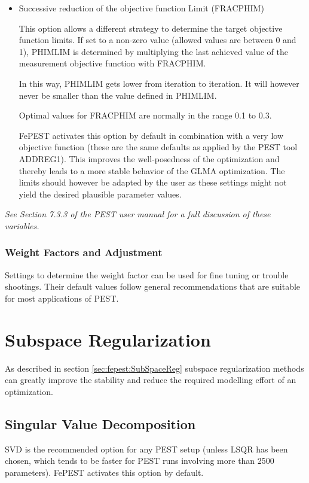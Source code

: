 \begin{itemize}
\item Successive reduction of the objective function Limit (FRACPHIM)

This option allows a different strategy to determine the target objective function limits. If set to a non-zero value (allowed values are between 0 and 1), PHIMLIM is determined by multiplying the last achieved value of the measurement objective function with FRACPHIM.

In this way, PHIMLIM gets lower from iteration to iteration. It will however never be smaller than the value defined in PHIMLIM.

Optimal values for FRACPHIM are normally in the range 0.1 to 0.3. 

FePEST activates this option by default in combination with a very low objective function (these are the same defaults as applied by the PEST tool ADDREG1). This improves the well-posedness of the optimization and thereby leads to a more stable behavior of the GLMA optimization. The limits should however be adapted by the user as these settings might not yield the desired plausible parameter values. 

\end{itemize}

\textit{See Section 7.3.3 of the PEST user manual for a full discussion of these variables.}

\subsubsection{Weight Factors and Adjustment}

Settings to determine the weight factor can be used for fine tuning or trouble shootings. Their default values follow general recommendations that are suitable for most applications of PEST. 

\section{Subspace Regularization}

As described in section \ref{sec:fepest:SubSpaceReg} subspace regularization methods can greatly improve the stability and reduce the required modelling effort of an optimization.

\subsection{Singular Value Decomposition}

SVD is the recommended option for any PEST setup (unless LSQR has been chosen, which tends to be faster for PEST runs involving more than 2500 parameters). FePEST activates this option by default.

